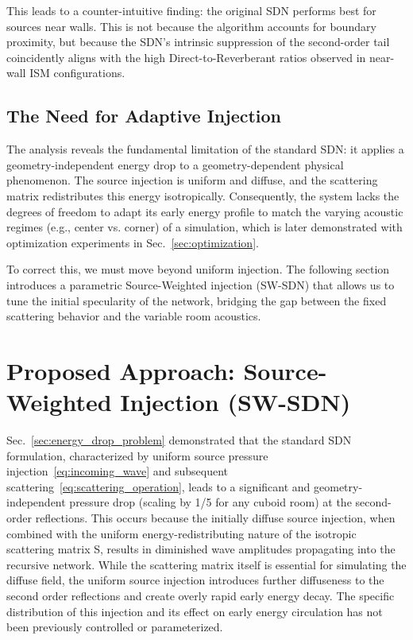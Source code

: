 \documentclass[journal]{IEEEtran}
\begin{document}
This leads to a counter-intuitive finding: the original SDN performs best for sources near walls. This is not because the algorithm accounts for boundary proximity, but because the SDN's intrinsic suppression of the second-order tail coincidently aligns with the high Direct-to-Reverberant ratios observed in near-wall ISM configurations.

\subsection{The Need for Adaptive Injection}

The analysis reveals the fundamental limitation of the standard SDN: it applies a geometry-independent energy drop to a geometry-dependent physical phenomenon. The source injection is uniform and diffuse, and the scattering matrix redistributes this energy isotropically. Consequently, the system lacks the degrees of freedom to adapt its early energy profile to match the varying acoustic regimes (e.g., center vs. corner) of a simulation, which is later demonstrated with optimization experiments in Sec.~\ref{sec:optimization}.

To correct this, we must move beyond uniform injection. The following section introduces a parametric Source-Weighted injection (SW-SDN) that allows us to tune the initial specularity of the network, bridging the gap between the fixed scattering behavior and the variable room acoustics.

\section{Proposed Approach: Source-Weighted Injection (SW-SDN)}
\label{sec:proposed_approach}
Sec.~\ref{sec:energy_drop_problem} demonstrated that the standard SDN formulation, characterized by uniform source pressure injection~\eqref{eq:incoming_wave} and subsequent scattering~\eqref{eq:scattering_operation}, leads to a significant and geometry-independent pressure drop (scaling by 1/5 for any cuboid room) at the second-order reflections. 
This occurs because the initially diffuse source injection, when combined with the uniform energy-redistributing nature of the isotropic scattering matrix S, results in diminished wave amplitudes propagating into the recursive network. While the scattering matrix itself is essential for simulating the diffuse field, the uniform source injection introduces further diffuseness to the second order reflections and create overly rapid early energy decay. The specific distribution of this injection and its effect on early energy circulation has not been previously controlled or parameterized.
\end{document}
